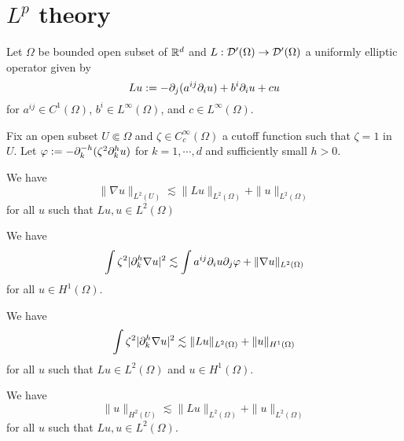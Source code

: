 \documentclass{../../large}
\begin{document}
\section{$L^p$ theory}
\begin{prb}
Let $\Omega$ be bounded open subset of $\mathbb{R}^d$ and $L:\mathcal{D}'(\Omega)\to\mathcal{D}'(\Omega)$ a uniformly elliptic operator given by
\[Lu:=-\pd_j(a^{ij}\pd_iu)+b^i\pd_iu+cu\]
for $a^{ij}\in C^1(\Omega)$, $b^i\in L^\infty(\Omega)$, and $c\in L^\infty(\Omega)$.

Fix an open subset $U\Subset\Omega$ and $\zeta\in C_c^\infty(\Omega)$ a cutoff function such that $\zeta=1$ in $U$.
Let $\f:=-\pd_k^{-h}(\zeta^2\pd_k^hu)$ for $k=1,\cdots,d$ and sufficiently small $h>0$.
\begin{parts}
\item We have
\[\|\nabla u\|_{L^2(U)}\lesssim\|Lu\|_{L^2(\Omega)}+\|u\|_{L^2(\Omega)}\]
for all $u$ such that $Lu,u\in L^2(\Omega)$
\item We have
\[\int\zeta^2|\pd_k^h\nabla u|^2\lesssim\int a^{ij}\pd_iu\pd_j\f+\|\nabla u\|_{L^2(\Omega)}\]
for all $u\in H^1(\Omega)$.
\item We have
\[\int\zeta^2|\pd_k^h\nabla u|^2\lesssim\|Lu\|_{L^2(\Omega)}+\|u\|_{H^1(\Omega)}\]
for all $u$ such that $Lu\in L^2(\Omega)$ and $u\in H^1(\Omega)$.
\item We have
\[\|u\|_{H^2(U)}\lesssim\|Lu\|_{L^2(\Omega)}+\|u\|_{L^2(\Omega)}\]
for all $u$ such that  $Lu,u\in L^2(\Omega)$.
\end{parts}
\end{prb}
\end{document}
